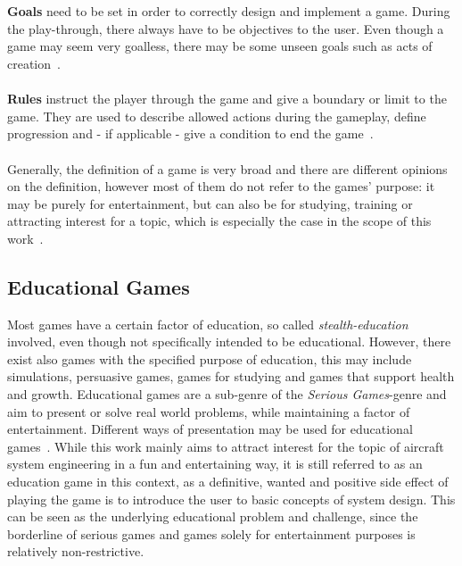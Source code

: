 \\
\\
\textbf{Goals} need to be set in order to correctly design and implement a game.
During the play-through, there always have to be objectives to the user.
Even though a game may seem very goalless, there may be some unseen goals such as acts of creation~\cite[p.~4-9]{10.5555/2544002}.
\\
\\
\textbf{Rules} instruct the player through the game and give a boundary or limit to the game.
They are used to describe allowed actions during the gameplay, define progression and - if applicable - give a condition to
end the game~\cite[p.~4-9]{10.5555/2544002}.
\\
\\
Generally, the definition of a game is very broad and there are different opinions on the definition, however most of them
do not refer to the games' purpose: it may be purely for entertainment, but can also be for studying, training or attracting interest
for a topic, which is especially the case in the scope of this work~\cite[p.~11]{10.5555/2544002}.

\subsection{Educational Games}\label{subsec:educational-games}
Most games have a certain factor of education, so called \textit{stealth-education} involved, even though not
specifically intended to be educational.
However, there exist also games with the specified purpose of education, this may include simulations, persuasive games,
games for studying and games that support health and growth.
Educational games are a sub-genre of the \textit{Serious Games}-genre and aim to present or solve real world problems,
while maintaining a factor of entertainment.
Different ways of presentation may be used for educational games~\cite[p.43]{10.5555/2544002}.
While this work mainly aims to attract interest for the topic of aircraft system engineering in a fun and entertaining way, it is still
referred to as an education game in this context, as a definitive, wanted and positive side effect of playing the game is
to introduce the user to basic concepts of system design.
This can be seen as the underlying educational problem and challenge, since the borderline of serious games and games solely
for entertainment purposes is relatively non-restrictive.

